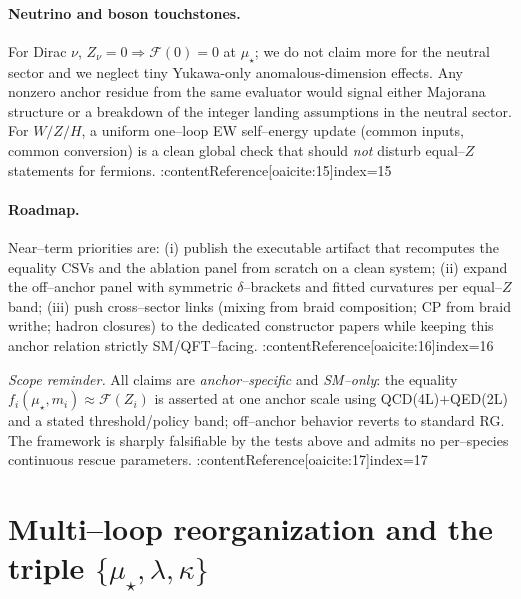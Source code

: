 \documentclass[epjc3]{svjour3}
\begin{document}
\paragraph{Neutrino and boson touchstones.}
For Dirac $\nu$, $Z_\nu=0\Rightarrow \mathcal F(0)=0$ at $\mu_\star$; we do not claim more for the neutral sector and we neglect tiny Yukawa-only anomalous-dimension effects. Any nonzero anchor residue from the same evaluator would signal either Majorana structure or a breakdown of the integer landing assumptions in the neutral sector. For $W/Z/H$, a uniform one–loop EW self–energy update (common inputs, common conversion) is a clean global check that should \emph{not} disturb equal–$Z$ statements for fermions. :contentReference[oaicite:15]{index=15}

\paragraph{Roadmap.}
Near–term priorities are: (i) publish the executable artifact that recomputes the equality CSVs and the ablation panel from scratch on a clean system; (ii) expand the off–anchor panel with symmetric $\delta$–brackets and fitted curvatures per equal–$Z$ band; (iii) push cross–sector links (mixing from braid composition; CP from braid writhe; hadron closures) to the dedicated constructor papers while keeping this anchor relation strictly SM/QFT–facing. :contentReference[oaicite:16]{index=16}

\medskip
\noindent\emph{Scope reminder.} All claims are \emph{anchor–specific} and \emph{SM–only}: the equality $f_i(\mu_\star,m_i) \approx \mathcal F(Z_i)$ is asserted at one anchor scale using QCD(4L)$+$QED(2L) and a stated threshold/policy band; off–anchor behavior reverts to standard RG. The framework is sharply falsifiable by the tests above and admits no per–species continuous rescue parameters. :contentReference[oaicite:17]{index=17}

%

\appendix
\section{Multi\texorpdfstring{--}{--}loop reorganization and the triple \texorpdfstring{$\{\mu_\star,\lambda,\kappa\}$}{\{\mu\_*,\textbackslash lambda,\textbackslash kappa\}}}
\end{document}

